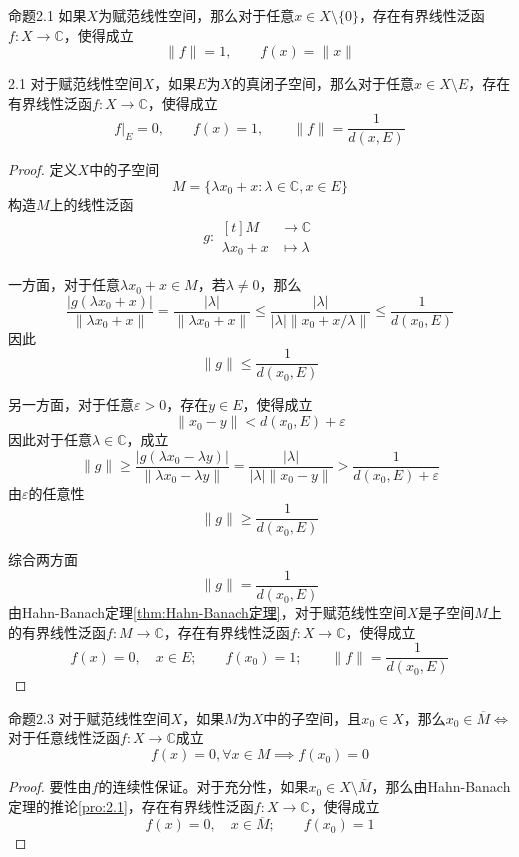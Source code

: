 \documentclass[lang = cn, scheme = chinese, thmcnt = section]{elegantbook}
\newcommand{\C}{\mathbb{C}}  		   %
\begin{document}
\begin{corollary}{}{命题2.1}
	如果$X$为赋范线性空间，那么对于任意$x\in X\setminus\{0\}$，存在有界线性泛函$f:X\to \C$，使得成立
	$$
	\|f\|=1,\qquad f(x)=\|x\|
	$$
\end{corollary}

\begin{proposition}{}{2.1}
	对于赋范线性空间$X$，如果$E$为$X$的真闭子空间，那么对于任意$x\in X\setminus E$，存在有界线性泛函$f:X\to\C$，使得成立
	$$
	f|_E=0,\qquad f(x)=1,\qquad \|f\|=\frac{1}{d(x, E)}
	$$
\end{proposition}

\begin{proof}
	定义$X$中的子空间
	$$
	M=\{ \lambda x_0+x:\lambda\in\C,x\in E \}
	$$
	构造$M$上的线性泛函
	\begin{align*}
		g:\begin{aligned}[t]
			M&\longrightarrow \C\\
			\lambda x_0+x&\longmapsto \lambda
		\end{aligned}
	\end{align*}
	
	一方面，对于任意$\lambda x_0+x\in M$，若$\lambda\ne 0$，那么
	$$
	\frac{|g(\lambda x_0+x)|}{\|\lambda x_0+x\|}
	=\frac{|\lambda|}{\|\lambda x_0+x\|}\le\frac{|\lambda|}{|\lambda|\|x_0+x/\lambda\|}\le\frac{1}{d(x_0,E)}
	$$
	因此
	$$
	\|g\|\le \frac{1}{d(x_0,E)}
	$$
	
	另一方面，对于任意$\varepsilon>0$，存在$y\in E$，使得成立
	$$
	\|x_0-y\|<d(x_0,E)+\varepsilon
	$$
	因此对于任意$\lambda\in\C$，成立
	$$
	\|g\|\ge\frac{|g(\lambda x_0-\lambda y)|}{\|\lambda x_0-\lambda y\|}
	=\frac{|\lambda|}{|\lambda|\|x_0-y\|}>\frac{1}{d(x_0,E)+\varepsilon}
	$$
	由$\varepsilon$​的任意性
	$$
	\|g\|\ge\frac{1}{d(x_0,E)}
	$$
	
	综合两方面
	$$
	\|g\|=\frac{1}{d(x_0,E)}
	$$
	由Hahn-Banach定理\ref{thm:Hahn-Banach定理}，对于赋范线性空间$X$是子空间$M$上的有界线性泛函$f:M\to\C$，存在有界线性泛函$f:X\to\C$，使得成立
	$$
	f(x)=0,\quad x\in E;\qquad f(x_0)=1;\qquad \|f\|=\frac{1}{d(x_0, E)}
	$$
\end{proof}

\begin{corollary}{}{命题2.3}
	对于赋范线性空间$X$，如果$M$为$X$中的子空间，且$x_0\in X$，那么$x_0\in\overline{M}\iff$对于任意线性泛函$f:X\to\C$成立
	$$
	f(x)=0,\forall x\in M\implies f(x_0)=0
	$$
\end{corollary}

\begin{proof}
	要性由$f$的连续性保证。对于充分性，如果$x_0\in X\setminus\overline{M}$，那么由Hahn-Banach定理的推论\ref{pro:2.1}，存在有界线性泛函$f:X\to\C$​，使得成立
	$$
	f(x)=0,\quad x\in \overline{M};\qquad f(x_0)=1
	$$
\end{proof}
\end{document}
